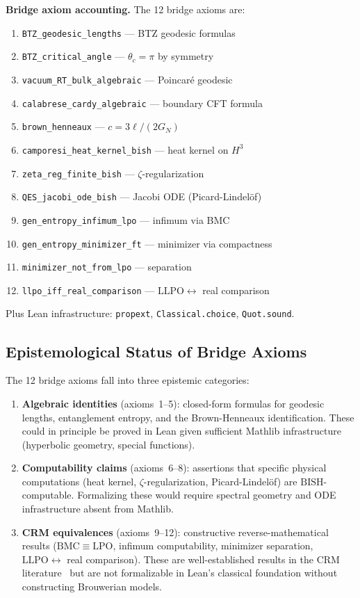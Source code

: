\documentclass[11pt,a4paper]{article}
\theoremstyle{plain}
\theoremstyle{definition}
\newcommand{\LPO}{\ensuremath{\mathrm{LPO}}}
\newcommand{\LLPO}{\ensuremath{\mathrm{LLPO}}}
\newcommand{\BISH}{\ensuremath{\mathrm{BISH}}}
\newcommand{\BMC}{\ensuremath{\mathrm{BMC}}}
\newcommand{\GN}{\ensuremath{G_N}}
\begin{document}
\noindent\textbf{Bridge axiom accounting.}
The 12 bridge axioms are:
\begin{enumerate}[nosep,label=(\arabic*)]
\item \texttt{BTZ\_geodesic\_lengths} --- BTZ geodesic formulas
\item \texttt{BTZ\_critical\_angle} --- $\theta_c = \pi$ by symmetry
\item \texttt{vacuum\_RT\_bulk\_algebraic} --- Poincar\'e geodesic
\item \texttt{calabrese\_cardy\_algebraic} --- boundary CFT formula
\item \texttt{brown\_henneaux} --- $c = 3\ell/(2\GN)$
\item \texttt{camporesi\_heat\_kernel\_bish} --- heat kernel on $H^3$
\item \texttt{zeta\_reg\_finite\_bish} --- $\zeta$-regularization
\item \texttt{QES\_jacobi\_ode\_bish} --- Jacobi ODE (Picard-Lindel\"of)
\item \texttt{gen\_entropy\_infimum\_lpo} --- infimum via BMC
\item \texttt{gen\_entropy\_minimizer\_ft} --- minimizer via compactness
\item \texttt{minimizer\_not\_from\_lpo} --- separation
\item \texttt{llpo\_iff\_real\_comparison} --- $\LLPO \leftrightarrow$ real comparison
\end{enumerate}
Plus Lean infrastructure: \texttt{propext}, \texttt{Classical.choice},
\texttt{Quot.sound}.

\subsection{Epistemological Status of Bridge Axioms}\label{sec:epistemic}

The 12 bridge axioms fall into three epistemic categories:
\begin{enumerate}[nosep,label=(\roman*)]
\item \textbf{Algebraic identities}
  (axioms~1--5): closed-form formulas for geodesic lengths,
  entanglement entropy, and the Brown-Henneaux identification.
  These could in principle be proved in Lean given sufficient
  Mathlib infrastructure (hyperbolic geometry, special functions).
\item \textbf{Computability claims}
  (axioms~6--8): assertions that specific physical computations
  (heat kernel, $\zeta$-regularization, Picard-Lindel\"of) are
  $\BISH$-computable.  Formalizing these would require spectral
  geometry and ODE infrastructure absent from Mathlib.
\item \textbf{CRM equivalences}
  (axioms~9--12): constructive reverse-mathematical results
  ($\BMC \equiv \LPO$, infimum computability, minimizer separation,
  $\LLPO \leftrightarrow$ real comparison).
  These are well-established results in the CRM
  literature~\cite{BB1985,BR1987,Ishihara2006} but are not
  formalizable in Lean's classical foundation without
  constructing Brouwerian models.
\end{enumerate}
\end{document}
